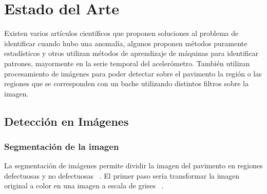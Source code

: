 \chapter{Estado del Arte}\label{chapter:state-of-the-art}

Existen varios artículos científicos que proponen soluciones al problema de identificar cuando hubo una anomalía, algunos proponen métodos
puramente estadísticos y otros utilizan métodos de aprendizaje de máquinas para identificar patrones, mayormente en la serie temporal del
acelerómetro. También utilizan procesamiento de imágenes para poder detectar sobre el pavimento la región o las regiones que se corresponden
con un bache utilizando distintos filtros sobre la imagen.

\section{Detección en Imágenes}

\subsection{Segmentación de la imagen}
La segmentación de imágenes permite  dividir la imagen del pavimento en regiones defectuosas y no defectuosas ~\parencite{koch2011pothole}.
El primer paso sería transformar la imagen original a color en una imagen a escala de grises  ~\parencite{koch2011pothole}.








